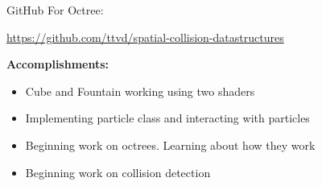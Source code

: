 GitHub For Octree:

\url{https://github.com/ttvd/spatial-collision-datastructures}

\textbf{Accomplishments:}
\begin{itemize}
  \item{Cube and Fountain working using two shaders}
  \item{Implementing particle class and interacting with particles}
  \item{Beginning work on octrees. Learning about how they work}
  \item{Beginning work on collision detection}
\end{itemize}



